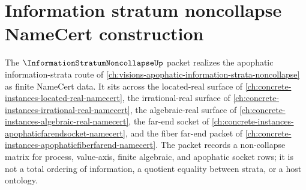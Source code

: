 \chapter{Information stratum noncollapse NameCert construction}
\label{ch:concrete-instances-information-stratum-noncollapse-namecert}

The $\InformationStratumNoncollapseUp$ packet realizes the apophatic information-strata route of \autoref{ch:visions-apophatic-information-strata-noncollapse} as finite NameCert data. It sits across the located-real surface of \autoref{ch:concrete-instances-located-real-namecert}, the irrational-real surface of \autoref{ch:concrete-instances-irrational-real-namecert}, the algebraic-real surface of \autoref{ch:concrete-instances-algebraic-real-namecert}, the far-end socket of \autoref{ch:concrete-instances-apophaticfarendsocket-namecert}, and the fiber far-end packet of \autoref{ch:concrete-instances-apophaticfiberfarend-namecert}. The packet records a non-collapse matrix for process, value-axis, finite algebraic, and apophatic socket rows; it is not a total ordering of information, a quotient equality between strata, or a host ontology.


